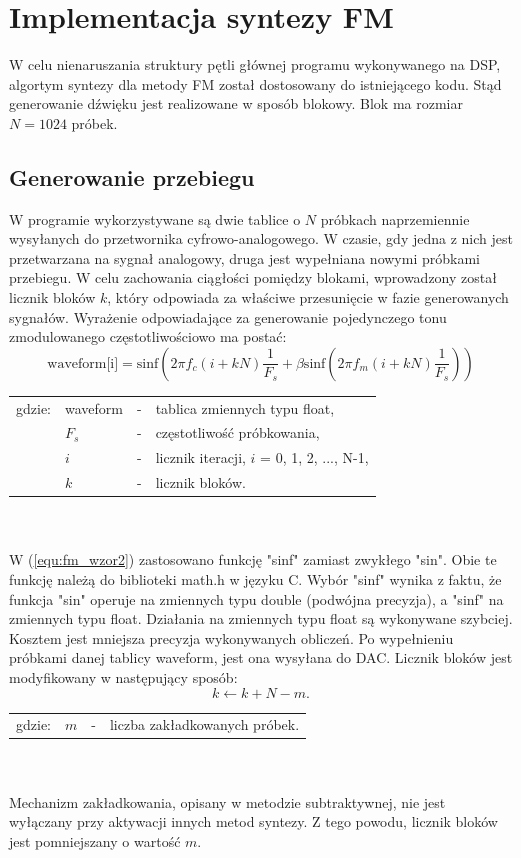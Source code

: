 \section{Implementacja syntezy FM}
W celu nienaruszania struktury pętli głównej programu wykonywanego na DSP, algortym syntezy dla metody FM został dostosowany do istniejącego kodu. Stąd generowanie dźwięku jest realizowane w sposób blokowy. Blok ma rozmiar $N = 1024$ próbek. 
\subsection{Generowanie przebiegu} \label{sec:fm_gen_przeb}
W programie wykorzystywane są dwie tablice o $N$ próbkach naprzemiennie wysyłanych do przetwornika cyfrowo-analogowego. W czasie, gdy jedna z nich jest przetwarzana na sygnał analogowy, druga jest wypełniana nowymi próbkami przebiegu. W celu zachowania ciągłości pomiędzy blokami, wprowadzony został licznik bloków $k$, który odpowiada za właściwe przesunięcie w fazie generowanych sygnałów. Wyrażenie odpowiadające za generowanie pojedynczego tonu zmodulowanego częstotliwościowo ma postać: 
\begin{equation} \label{equ:fm_wzor2}
\text{waveform[i]} = \text{sinf}(2\pi f_c(i+kN)\frac{1}{F_s} + \beta \text{sinf}(2 \pi f_m(i+kN)\frac{1}{F_s}))
\end{equation}
\begin{tabular}{ l l l l}
	gdzie: & waveform &  - & tablica zmiennych typu float, \\
	&	$F_s$ & - & częstotliwość próbkowania,\\
	&	$i$ & - &  licznik iteracji, $i$ = 0, 1, 2, ..., N-1,\\
	&	$k$ & - &  licznik bloków.\\
\end{tabular} \\ \\
W (\ref{equ:fm_wzor2}) zastosowano funkcję "sinf" zamiast zwykłego "sin". Obie te funkcję należą do biblioteki math.h w języku C. Wybór "sinf" wynika z faktu, że funkcja "sin" operuje na zmiennych typu double (podwójna precyzja), a "sinf" na zmiennych typu float. Działania na zmiennych typu float są wykonywane szybciej. Kosztem jest mniejsza precyzja wykonywanych obliczeń.
Po wypełnieniu próbkami danej tablicy waveform, jest ona wysyłana do DAC. Licznik bloków jest modyfikowany w następujący sposób:
\begin{equation} \label{equ:fm_wzor3}
k \gets k + N - m.
\end{equation}
\begin{tabular}{ l l l l}
	gdzie: & $m$  &  - & liczba zakładkowanych próbek. \\
\end{tabular} \\ \\
Mechanizm zakładkowania, opisany w metodzie subtraktywnej, nie jest wyłączany przy aktywacji innych metod syntezy. Z tego powodu, licznik bloków jest pomniejszany o wartość $m$.
